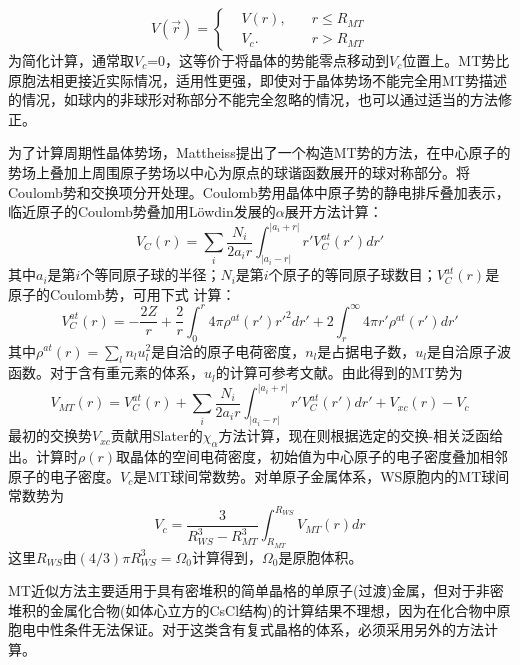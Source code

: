 \begin{equation}
  V(\vec r)=\left\{
  \begin{aligned}
    &V(r),\quad&r\leqslant R_{MT} \\
    &V_c.&r>R_{MT}
  \end{aligned}\right.
  \label{eq:Muffin-Tin}
\end{equation}
为简化计算，通常取$V_c$=0，这等价于将晶体的势能零点移动到$V_c$位置上。MT势比原胞法相更接近实际情况，适用性更强，即使对于晶体势场不能完全用MT势描述的情况，如球内的非球形对称部分不能完全忽略的情况，也可以通过适当的方法修正。

为了计算周期性晶体势场，Mattheiss提出了一个构造MT势的方法，在中心原子的势场上叠加上周围原子势场以中心为原点的球谐函数展开的球对称部分\cite{PRA133-1399_1964}。将Coulomb势和交换项分开处理。Coulomb势用晶体中原子势的静电排斥叠加表示，临近原子的Coulomb势叠加用L\"owdin发展的$\alpha$展开方法计算：
\begin{equation}
  V_C(r)=\sum_i\dfrac{N_i}{2a_ir}\int_{|a_i-r|}^{|a_i+r|}r'V_C^{at}(r')dr'
  \label{eq:lodin-alpha}
\end{equation}
其中$a_i$是第$i$个等同原子球的半径；$N_i$是第$i$个原子的等同原子球数目；$V_C^{at}(r)$是原子的Coulomb势，可用下式%
计算：
\begin{equation}
  V_C^{at}(r)=-\dfrac{2Z}r+\frac2r\int_0^r4\pi\rho^{at}(r')r'^2dr'+2\int_r^{\infty}4\pi r'\rho^{at}(r')dr'
  \label{eq:atomic-coulomb}
\end{equation}
其中$\rho^{at}(r)=\sum\limits_l n_lu_l^2$是自洽的原子电荷密度，$n_l$是占据电子数，$u_l$是自洽原子波函数\cite{Herman-Skillman}。对于含有重元素的体系，$u_l$的计算可参考文献。由此得到的MT势为
\begin{equation}
  V_{MT}(r)=V_C^{at}(r)+\sum_i\dfrac{N_i}{2a_ir}\int_{|a_i-r|}^{|a_i+r|}r'V_C^{at}(r')dr'+V_{xc}(r)-V_c
  \label{eq:potential-MT}
\end{equation}
最初的交换势$V_{xc}$贡献用Slater的$\chi_{\alpha}$方法计算\cite{PR81-385_1951}，现在则根据选定的交换-相关泛函给出。计算时$\rho(r)$取晶体的空间电荷密度，初始值为中心原子的电子密度叠加相邻原子的电子密度。$V_c$是MT球间常数势。对单原子金属体系，WS原胞内的MT球间常数势为
\begin{equation}
  V_c=\dfrac3{R_{WS}^3-R_{MT}^3}\int_{R_{MT}}^{R_{WS}}V_{MT}(r)dr
  \label{eq:monoatomic-ini}
\end{equation}
这里$R_{WS}$由$(4/3)\pi R_{WS}^3=\Omega_0$计算得到，$\Omega_0$是原胞体积。

MT近似方法主要适用于具有密堆积的简单晶格的单原子(过渡)金属\cite{SSP26-104_1971}，但对于非密堆积的金属化合物(如体心立方的CsCl结构)\cite{PRB13-5362_1976}的计算结果不理想，因为在化合物中原胞电中性条件无法保证。对于这类含有复式晶格的体系，必须采用另外的方法计算\cite{PSSB36-447_1969}。

